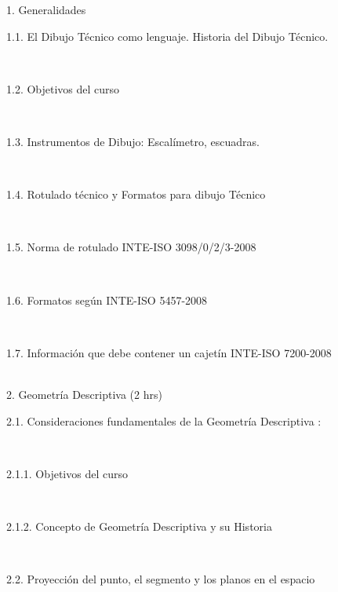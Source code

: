 \documentclass[letterpaper]{article}%
\begin{document}
\begin{tcolorbox}[
blanker,
width=0.78\textwidth,enlarge left by=0.24\textwidth,
before skip=6pt,
breakable,
overlay unbroken and first={%
    \node[inner sep=0pt,outer sep=0pt,text width=0.22\textwidth,
    align=none,
    below right]
    at ([xshift=-0.24\textwidth]frame.north west)
{
\hspace*{0mm}\fontsize{12}{14}\selectfont \textbf{\textcolor{parte}{4 Contenidos}}
};}]
1. Generalidades\\
\hspace*{0.02\linewidth}\parbox{0.98\linewidth}{\strut 1.1. El Dibujo Técnico como lenguaje. Historia del Dibujo Técnico.\strut}\\
\hspace*{0.02\linewidth}\parbox{0.98\linewidth}{\strut 1.2. Objetivos del curso\strut}\\
\hspace*{0.02\linewidth}\parbox{0.98\linewidth}{\strut 1.3. Instrumentos de Dibujo: Escalímetro, escuadras.\strut}\\
\hspace*{0.02\linewidth}\parbox{0.98\linewidth}{\strut 1.4. Rotulado técnico y Formatos para dibujo Técnico\strut}\\
\hspace*{0.02\linewidth}\parbox{0.98\linewidth}{\strut 1.5. Norma de rotulado INTE-ISO 3098/0/2/3-2008\strut}\\
\hspace*{0.02\linewidth}\parbox{0.98\linewidth}{\strut 1.6. Formatos según INTE-ISO 5457-2008\strut}\\
\hspace*{0.02\linewidth}\parbox{0.98\linewidth}{\strut 1.7. Información que debe contener un cajetín INTE-ISO 7200-2008\strut}\\
2. Geometría Descriptiva (2 hrs)\\
\hspace*{0.02\linewidth}\parbox{0.98\linewidth}{\strut 2.1. Consideraciones fundamentales de la Geometría Descriptiva :\strut}\\
\hspace*{0.04\linewidth}\parbox{0.96\linewidth}{\strut 2.1.1. Objetivos del curso\strut}\\
\hspace*{0.04\linewidth}\parbox{0.96\linewidth}{\strut 2.1.2. Concepto de Geometría Descriptiva y su Historia\strut}\\
\hspace*{0.02\linewidth}\parbox{0.98\linewidth}{\strut 2.2. Proyección del punto, el segmento y los planos en el espacio\strut}\\

\end{tcolorbox}
\end{document}
